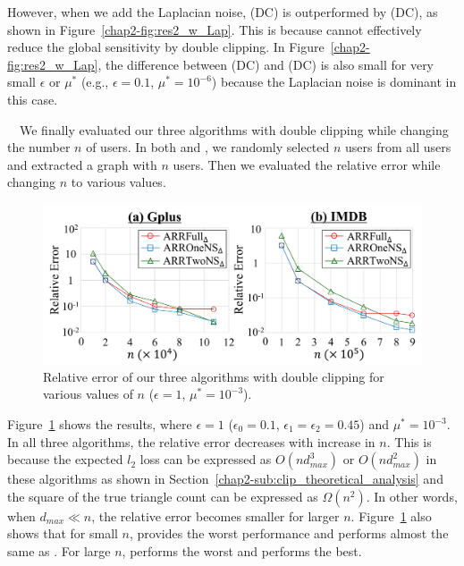 However, when we add the Laplacian noise, \AlgThree{} (DC) is outperformed by \AlgTwo{} (DC), as shown in Figure~\ref{chap2-fig:res2_w_Lap}. 
This is because \AlgThree{} cannot effectively reduce the global sensitivity by double clipping. 
In Figure~\ref{chap2-fig:res2_w_Lap}, the difference between \AlgTwo{} (DC) and \AlgOne{} (DC) is also small for very small $\epsilon$ or $\mu^*$ (e.g., $\epsilon=0.1$, $\mu^*=10^{-6}$) because the Laplacian noise is dominant in this case. 

\smallskip
{}~~We 
finally 
evaluated our three algorithms with double clipping while changing the number $n$ of users. 
In both \GPlus{} and \IMDB{}, we randomly selected $n$ users from all users and extracted a graph with $n$ users. 
Then we evaluated the relative error while changing $n$ to various values.

\begin{figure}[t]
  \centering
  \includegraphics[width=0.99\linewidth]{fig/res3_n.pdf}
  
  \caption{Relative error of our three algorithms with double clipping for various values of $n$ 
  ($\epsilon=1$, $\mu^*=10^{-3}$).} 
  \label{chap2-fig:res3_n}
\end{figure}

Figure~\ref{chap2-fig:res3_n} shows the results, where $\epsilon=1$ ($\epsilon_0=0.1$, $\epsilon_1 = \epsilon_2 = 0.45$) and $\mu^* = 10^{-3}$. 
In all 
three algorithms, the relative error decreases with increase in $n$.
This is because the expected $l_2$ loss can be expressed as 
$O(n d_{max}^3)$ or $O(n d_{max}^2)$ 
in these algorithms as shown in Section~\ref{chap2-sub:clip_theoretical_analysis} and the square of the true triangle count can be expressed as $\Omega(n^2)$.
In other words, when $d_{max} \ll n$, the relative error becomes smaller for larger $n$. 
Figure~\ref{chap2-fig:res3_n} also shows that for small $n$, \AlgThree{} provides the worst performance and 
\AlgTwo{} performs almost the same as \AlgOne{}. 
For large $n$, 
\AlgOne{} performs the worst and 
\AlgTwo{} performs the best. 


